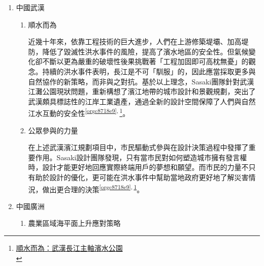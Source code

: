 \documentclass[a4paper,12pt]{article}
\begin{document}
\begin{enumerate}
\item 中國武漢
\label{sec:orgf822211}

\begin{enumerate}
\item 順水而為
\label{sec:org64ed22b}

近幾十年來，依靠工程技術的巨大進步，人們在上游修築堤壩、加高堤防，降低了毀滅性洪水事件的風險，提高了濱水地區的安全性。但氣候變化卻不斷以更為嚴重的破壞性後果挑戰著「工程加固即可高枕無憂」的觀念。持續的洪水事件表明，長江是不可「馴服」的，因此應當採取更多與自然協作的新策略，而非與之對抗。基於以上理念，Sasaki團隊針對武漢江灘公園現狀問題，重新構想了濱江地帶的城市設計和景觀規劃，突出了武漢頗具標誌性的江岸工業遺產，通過全新的設計空間保障了人們與自然江水互動的安全性\textsuperscript{\ref{orgc8718e9}}\textsuperscript{,}\,\footnote{\href{https://a.design/index.php?m=doc\&a=doc\_show\&id=528E3CD63464219F5E1BD8}{順水而為：武漢長江主軸濱水公園}\\\label{org54dde21}}。\\
\item 公眾參與的力量
\label{sec:orgad505b2}

在上述武漢濱江規劃項目中，市民驅動式參與在設計決策過程中發揮了重要作用。Sasaki設計團隊發現，只有當市民對如何塑造城市擁有發言權時，設計才能更好地回應實際終端用戶的夢想和願望。而市民的力量不只有助於設計的優化，更可能在洪水事件中幫助當地政府更好地了解災害情況，做出更合理的決策\textsuperscript{\ref{orgc8718e9}}\textsuperscript{,}\,\textsuperscript{\ref{org54dde21}}。\\
\end{enumerate}

\item 中國廣洲
\label{sec:org8f1e7bd}

\begin{enumerate}
\item 農業區域海平面上升應對策略
\label{sec:org46a732a}


\end{enumerate}
\end{enumerate}
\end{document}
